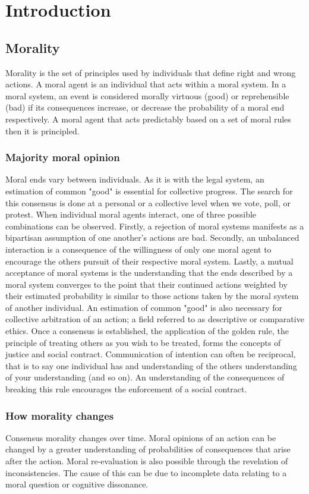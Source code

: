 \chapter{Introduction}
\section{Morality}
Morality is the set of principles used by individuals that define right and wrong actions.
A moral agent is an individual that acts within a moral system.
In a moral system, an event is considered morally virtuous (good) or reprehensible (bad) if its consequences increase, or decrease the probability of a moral end respectively.
A moral agent that acts predictably based on a set of moral rules then it is principled.

\subsection{Majority moral opinion}
Moral ends vary between individuals.
As it is with the legal system, an estimation of common "good" is essential for collective progress.
The search for this consensus is done at a personal or a collective level when we vote, poll, or protest. 
When individual moral agents interact, one of three possible combinations can be observed.
Firstly, a rejection of moral systems manifests as a bipartisan assumption of one another's actions are bad. 
Secondly, an unbalanced interaction is a consequence of the willingness of only one moral agent to encourage the others pursuit of their respective moral system.
Lastly, a mutual acceptance of moral systems is the understanding that the ends described by a moral system converges to the point that their continued actions weighted by their estimated probability is similar to those actions taken by the moral system of another individual.
An estimation of common "good" is also necessary for collective arbitration of an action; a field referred to as descriptive or comparative ethics.
Once a consensus is established, the application of the golden rule, the principle of treating others as you wish to be treated, forms the concepts of justice and social contract.
Communication of intention can often be reciprocal, that is to say one individual has and understanding of the others understanding of your understanding (and so on).
An understanding of the consequences of breaking this rule encourages the enforcement of a social contract.

\subsection{How morality changes}
Consensus morality changes over time.
Moral opinions of an action can be changed by a greater understanding of probabilities of consequences that arise after the action.
Moral re-evaluation is also possible through the revelation of inconsistencies.
The cause of this can be due to incomplete data relating to a moral question or cognitive dissonance.

